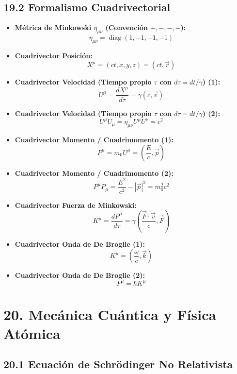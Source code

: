 \documentclass[11pt,a4paper]{article}
\begin{document}
\subsection*{19.2 Formalismo Cuadrivectorial}

\begin{itemize}
  \item \textbf{Métrica de Minkowski $\eta_{\mu\nu}$ (Convención $+,-,-,-$):}
  \[
    \eta_{\mu\nu} = \operatorname{diag}(1, -1, -1, -1)
  \]
  \item \textbf{Cuadrivector Posición:}
  \[
    X^\mu = (ct, x, y, z) = (ct, \vec{r})
  \]
  \item \textbf{Cuadrivector Velocidad (Tiempo propio $\tau$ con $d\tau = dt/\gamma$) (1):}
  \[
    U^\mu = \frac{dX^\mu}{d\tau} = \gamma(c, \vec{v})
  \]
  \item \textbf{Cuadrivector Velocidad (Tiempo propio $\tau$ con $d\tau = dt/\gamma$) (2):}
  \[
    U^\mu U_\mu = \eta_{\mu\nu} U^\mu U^\nu = c^2
  \]
  \item \textbf{Cuadrivector Momento / Cuadrimomento (1):}
  \[
    P^\mu = m_0 U^\mu = \left( \frac{E}{c}, \vec{p} \right)
  \]
  \item \textbf{Cuadrivector Momento / Cuadrimomento (2):}
  \[
    P^\mu P_\mu = \frac{E^2}{c^2} - |\vec{p}|^2 = m_0^2 c^2
  \]
  \item \textbf{Cuadrivector Fuerza de Minkowski:}
  \[
    K^\mu = \frac{dP^\mu}{d\tau} = \gamma \left( \frac{\vec{F} \cdot \vec{v}}{c}, \vec{F} \right)
  \]
  \item \textbf{Cuadrivector Onda de De Broglie (1):}
  \[
    K^\mu = \left( \frac{\omega}{c}, \vec{k} \right)
  \]
  \item \textbf{Cuadrivector Onda de De Broglie (2):}
  \[
    P^\mu = \hbar K^\mu
  \]
\end{itemize}

\section*{20. Mecánica Cuántica y Física Atómica}

\subsection*{20.1 Ecuación de Schrödinger No Relativista}
\end{document}
